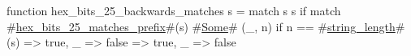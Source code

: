 function hex_bits_25_backwards_matches s = match s {
  s if match #\hyperref[sailRISCVzhexzybitszy25zymatcheszyprefix]{hex\_bits\_25\_matches\_prefix}#(s) {
    #\hyperref[sailRISCVzSome]{Some}# (_, n) if n == #\hyperref[sailRISCVzstringzylength]{string\_length}#(s) => true,
    _ => false
  } => true,
  _ => false
}
